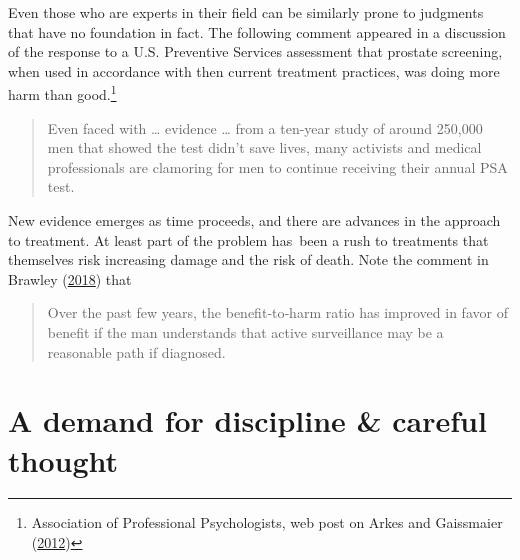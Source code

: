 \documentclass[
  10ptls,
  b5paper]{book}
\begin{document}
Even those who are experts in their field can be similarly prone to judgments that have no foundation in fact. The following comment appeared in a discussion of
the response to a U.S. Preventive Services assessment that prostate screening,
when used in accordance with then current treatment practices, was doing more
harm than good.\footnote{Association of Professional Psychologists, web post on Arkes and Gaissmaier (\protect\hyperlink{ref-arkes2012psychological}{2012})}

\begin{quote}
Even faced with \ldots{} evidence \ldots{} from a ten-year study of around 250,000
men that showed the test didn't save lives, many activists and medical professionals are clamoring for men to continue receiving their annual PSA test.
\end{quote}

New evidence emerges as time proceeds, and there are advances in the approach to treatment. At least part of the problem has~been a rush to treatments that themselves risk increasing damage and the risk of death. Note the comment in Brawley (\protect\hyperlink{ref-brawley2018prostate}{2018}) that

\begin{quote}
Over the past few years, the benefit‐to‐harm ratio has improved in favor of benefit if the man understands that active surveillance may be a reasonable path if diagnosed.
\end{quote}

\hypertarget{a-demand-for-discipline-careful-thought}{%
\section{A demand for discipline \& careful thought}\label{a-demand-for-discipline-careful-thought}}
\end{document}
